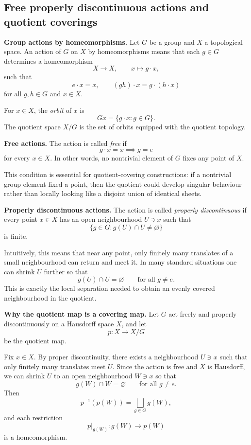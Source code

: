 \documentclass[12pt,a4paper]{article}
\theoremstyle{notespace}
\begin{document}
\subsection{Free properly discontinuous actions and quotient coverings}

\textbf{Group actions by homeomorphisms.}
Let \(G\) be a group and \(X\) a topological space. An action of \(G\) on \(X\) by homeomorphisms means that each \(g\in G\) determines a homeomorphism
\[
X\to X,\qquad x\mapsto g\cdot x,
\]
such that
\[
e\cdot x=x,\qquad (gh)\cdot x=g\cdot(h\cdot x)
\]
for all \(g,h\in G\) and \(x\in X\).

For \(x\in X\), the \emph{orbit} of \(x\) is
\[
Gx=\{g\cdot x : g\in G\}.
\]
The quotient space \(X/G\) is the set of orbits equipped with the quotient topology.

\medskip

\textbf{Free actions.}
The action is called \emph{free} if
\[
g\cdot x=x \implies g=e
\]
for every \(x\in X\). In other words, no nontrivial element of \(G\) fixes any point of \(X\).

This condition is essential for quotient-covering constructions: if a nontrivial group element fixed a point, then the quotient could develop singular behaviour rather than locally looking like a disjoint union of identical sheets.

\medskip

\textbf{Properly discontinuous actions.}
The action is called \emph{properly discontinuous} if every point \(x\in X\) has an open neighbourhood \(U\ni x\) such that
\[
\{g\in G : g(U)\cap U\neq \varnothing\}
\]
is finite.

Intuitively, this means that near any point, only finitely many translates of a small neighbourhood can return and meet it. In many standard situations one can shrink \(U\) further so that
\[
g(U)\cap U=\varnothing\qquad\text{for all }g\neq e.
\]
This is exactly the local separation needed to obtain an evenly covered neighbourhood in the quotient.

\medskip

\textbf{Why the quotient map is a covering map.}
Let \(G\) act freely and properly discontinuously on a Hausdorff space \(X\), and let
\[
p:X\to X/G
\]
be the quotient map.

Fix \(x\in X\). By proper discontinuity, there exists a neighbourhood \(U\ni x\) such that only finitely many translates meet \(U\). Since the action is free and \(X\) is Hausdorff, we can shrink \(U\) to an open neighbourhood \(W\ni x\) so that
\[
g(W)\cap W=\varnothing\qquad\text{for all }g\neq e.
\]
Then
\[
p^{-1}(p(W))=\bigsqcup_{g\in G} g(W),
\]
and each restriction
\[
p|_{g(W)}:g(W)\to p(W)
\]
is a homeomorphism.
\end{document}
